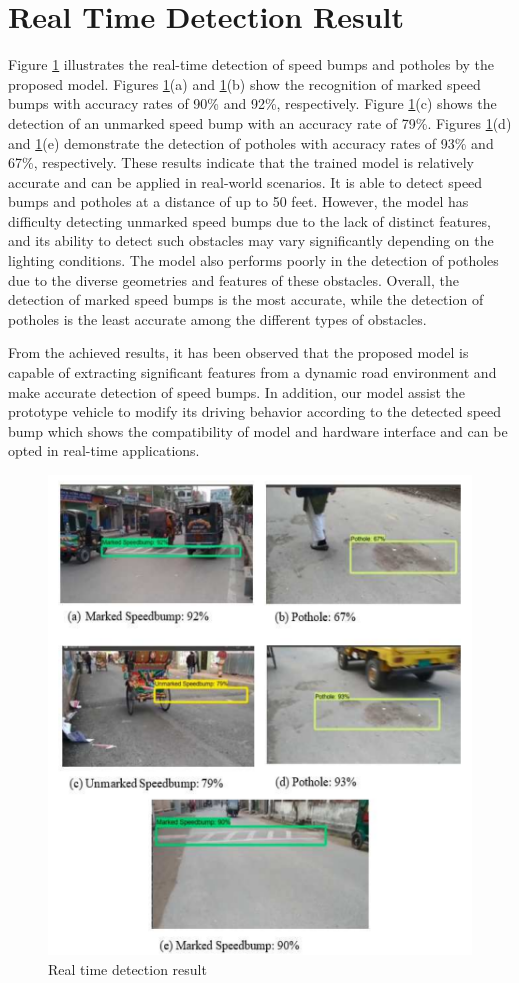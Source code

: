 \section{Real Time Detection Result}
Figure \ref{fig:results} illustrates the real-time detection of speed bumps and potholes by the proposed model. Figures \ref{fig:results}(a) and \ref{fig:results}(b) show the recognition of marked speed bumps with accuracy rates of 90\% and 92\%, respectively. Figure \ref{fig:results}(c) shows the detection of an unmarked speed bump with an accuracy rate of 79\%. Figures \ref{fig:results}(d) and \ref{fig:results}(e) demonstrate the detection of potholes with accuracy rates of 93\% and 67\%, respectively. These results indicate that the trained model is relatively accurate and can be applied in real-world scenarios. It is able to detect speed bumps and potholes at a distance of up to 50 feet. However, the model has difficulty detecting unmarked speed bumps due to the lack of distinct features, and its ability to detect such obstacles may vary significantly depending on the lighting conditions. The model also performs poorly in the detection of potholes due to the diverse geometries and features of these obstacles. Overall, the detection of marked speed bumps is the most accurate, while the detection of potholes is the least accurate among the different types of obstacles.

\noindent
From the achieved results, it has been observed that the proposed model is capable of extracting significant features from a dynamic road environment and make accurate detection of speed bumps. In addition, our model assist the prototype vehicle to modify its driving behavior according to the detected speed bump which shows the compatibility of model and
hardware interface and can be opted in real-time applications.
\begin{figure}[H]
    \centering
    \includegraphics{Figures/chapter4/results.png}
    \caption{Real time detection result }
    \label{fig:results}
\end{figure}
